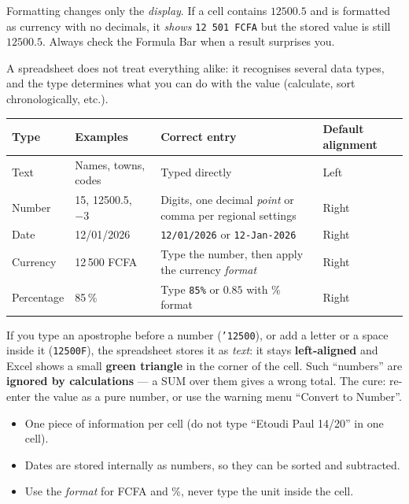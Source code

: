 \documentclass[11pt]{article}
\newcommand{\cle}[1]{{\popxbold\color{popdark}#1}}
\newcounter{popsec}
\newcounter{popsub}
\newcommand{\courssub}[1]{%
  \stepcounter{popsub}%
  \par\vspace{9pt}\noindent{\popxbold\fontsize{11.5}{13}\selectfont\color{popink}{\color{poporange}\thepopsec.\thepopsub}\hspace{6pt}#1}\par\nopagebreak\vspace{4pt}
}
\begin{document}
\begin{attention}
Formatting changes only the \emph{display}. If a cell contains $12500.5$ and is formatted as currency with no decimals, it \emph{shows} \texttt{12\,501 FCFA} but the stored value is still $12500.5$. Always check the Formula Bar when a result surprises you.
\end{attention}

\courssub{Data Types and Correct Entry}

A spreadsheet does not treat everything alike: it recognises several \cle{data types}, and the type determines what you can do with the value (calculate, sort chronologically, etc.).

\begin{center}
\begin{tabularx}{\linewidth}{|l|X|X|l|}
\hline
\rowcolor{popblueL} \textbf{Type} & \textbf{Examples} & \textbf{Correct entry} & \textbf{Default alignment} \\
\hline
Text & Names, towns, codes & Typed directly & Left \\
\hline
Number & 15, 12500.5, $-3$ & Digits, one decimal \emph{point} or comma per regional settings & Right \\
\hline
Date & 12/01/2026 & \texttt{12/01/2026} or \texttt{12-Jan-2026} & Right \\
\hline
Currency & 12\,500 FCFA & Type the number, then apply the currency \emph{format} & Right \\
\hline
Percentage & 85\,\% & Type \texttt{85\%} or $0.85$ with \% format & Right \\
\hline
\end{tabularx}
\end{center}

\begin{attention}
If you type an apostrophe before a number (\texttt{'12500}), or add a letter or a space inside it (\texttt{12500F}), the spreadsheet stores it as \emph{text}: it stays \textbf{left-aligned} and Excel shows a small \textbf{green triangle} in the corner of the cell. Such ``numbers'' are \textbf{ignored by calculations} --- a SUM over them gives a wrong total. The cure: re-enter the value as a pure number, or use the warning menu ``Convert to Number''.
\end{attention}

\begin{aretenir}
\begin{itemize}
\item One piece of information per cell (do not type ``Etoudi Paul 14/20'' in one cell).
\item Dates are stored internally as numbers, so they can be sorted and subtracted.
\item Use the \emph{format} for FCFA and \%, never type the unit inside the cell.
\end{itemize}
\end{aretenir}
\end{document}
